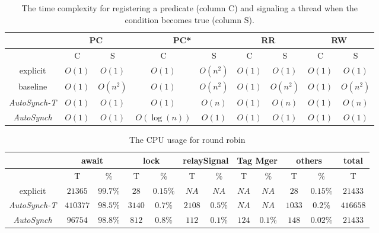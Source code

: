 \documentclass[preprint]{sigplanconf}
\begin{document}
\begin{table}[ht!]
   \centering
   \begin{tabular}{|c||c|c||c|c||c|c||c|c|}
      \hline 
      & \multicolumn{2}{c||}{PC} & \multicolumn{2}{c||}{PC*} & 
        \multicolumn{2}{c||}{RR} & \multicolumn{2}{c|}{RW} \\
      \hline
         & C & S & C & S & C & S & C & S \\
      \hline 
      \hline 
      explicit & $O(1)$ & $O(1)$ & $O(1)$ & $O(n^2)$ & $O(1)$ & $O(1)$ & $O(1)$ &
      $O(1)$ \\
      \hline 
      baseline & $O(1)$ & $O(n^2)$ & $O(1)$ & $O(n^2)$ & $O(1)$ & $O(n^2)$ &
      $O(1)$ & $O(n^2)$ \\
      \hline 
      {\em  AutoSynch-T} & $O(1)$ & $O(1)$ & $O(1)$ & $O(n)$ & $O(1)$ & $O(n)$ & $O(1)$ 
      & $O(n)$ \\
      \hline 
      {\em AutoSynch} & $O(1)$ & $O(1)$ & $O(\log(n))$ & $O(1)$ & $O(1)$ & $O(1)$ & 
      $O(1)$ & $O(1)$\\
      \hline 
   \end{tabular}
   \caption{The time complexity for registering a predicate (column C) and signaling a thread when the condition becomes true
   (column S).}
   \label{tab:complexity}
\end{table}

\begin{table}[ht!]
   \centering
   \begin{tabular}{|c||c|c||c|c||c|c||c|c|c|c|c|}
      \hline 
      & \multicolumn{2}{c||}{await} & \multicolumn{2}{c||}{lock} & 
        \multicolumn{2}{c||}{relaySignal} & \multicolumn{2}{c|}{Tag Mger} &
        \multicolumn{2}{c|}{others} & total \\
      \hline
         & T & \% & T & \% & T & \% & T & \% & T & \% & T \\
      \hline 
      \hline 
      explicit & $21365$ & $99.7\%$ & $28$ & $0.15\%$ & $NA$ & $NA$ & $NA$ &
      $NA$  & $28$ & $0.15\%$ & $21433$ \\
      \hline 
      {\em AutoSynch-T} & $410377$ & $98.5\%$ & $3140$ & $0.7\%$ & $2108$ & $0.5\%$
      & $NA$ & $NA$ & $1033$ & $0.2\%$ & $416658$\\
      \hline 
      {\em AutoSynch} & $96754$ & $98.8\%$ & $812$ & $0.8\%$ & $112$ & $0.1\%$ & 
      $124$ & $0.1\%$ & $148$ & $0.02\%$ & $21433$\\
      \hline 
   \end{tabular}
   \caption{The CPU usage for round robin}
   \label{tab:cpu}
\end{table}
\end{document}
